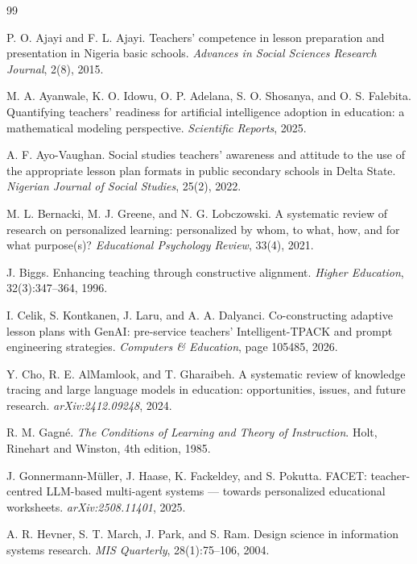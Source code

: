 \documentclass{article}
\begin{document}

\begin{thebibliography}{99}
\small

 P. O. Ajayi and F. L. Ajayi. Teachers' competence in
lesson preparation and presentation in Nigeria basic schools. \emph{Advances in Social Sciences
Research Journal}, 2(8), 2015.

 M. A. Ayanwale, K. O. Idowu, O. P. Adelana,
S. O. Shosanya, and O. S. Falebita. Quantifying teachers' readiness for artificial intelligence
adoption in education: a mathematical modeling perspective. \emph{Scientific Reports}, 2025.

 A. F. Ayo-Vaughan. Social studies teachers' awareness
and attitude to the use of the appropriate lesson plan formats in public secondary schools in
Delta State. \emph{Nigerian Journal of Social Studies}, 25(2), 2022.

 M. L. Bernacki, M. J. Greene, and N. G.
Lobczowski. A systematic review of research on personalized learning: personalized by whom, to
what, how, and for what purpose(s)? \emph{Educational Psychology Review}, 33(4), 2021.

 J. Biggs. Enhancing teaching through constructive alignment.
\emph{Higher Education}, 32(3):347--364, 1996.

 I. Celik, S. Kontkanen, J. Laru, and A. A. Dalyanci.
Co-constructing adaptive lesson plans with GenAI: pre-service teachers' Intelligent-TPACK and
prompt engineering strategies. \emph{Computers \& Education}, page 105485, 2026.

 Y. Cho, R. E. AlMamlook, and T. Gharaibeh. A systematic review
of knowledge tracing and large language models in education: opportunities, issues, and future
research. \emph{arXiv:2412.09248}, 2024.

 R. M. Gagn\'e. \emph{The Conditions of Learning and Theory of
Instruction}. Holt, Rinehart and Winston, 4th edition, 1985.

 J. Gonnermann-M\"uller, J. Haase, K. Fackeldey,
and S. Pokutta. FACET: teacher-centred LLM-based multi-agent systems --- towards personalized
educational worksheets. \emph{arXiv:2508.11401}, 2025.

 A. R. Hevner, S. T. March, J. Park, and S. Ram. Design
science in information systems research. \emph{MIS Quarterly}, 28(1):75--106, 2004.


\end{thebibliography}
\end{document}
